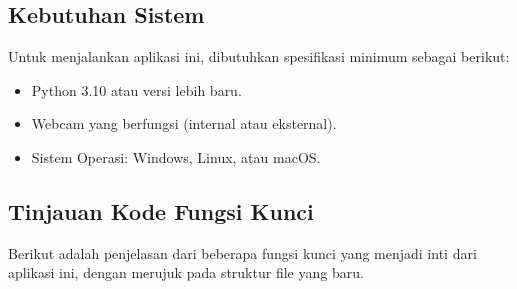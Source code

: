 \documentclass[11pt,a4paper]{article}
\begin{document}
\subsection{Kebutuhan Sistem}
Untuk menjalankan aplikasi ini, dibutuhkan spesifikasi minimum sebagai berikut:
\begin{itemize}
    \item Python 3.10 atau versi lebih baru.
    \item Webcam yang berfungsi (internal atau eksternal).
    \item Sistem Operasi: Windows, Linux, atau macOS.
\end{itemize}

\subsection{Tinjauan Kode Fungsi Kunci}
Berikut adalah penjelasan dari beberapa fungsi kunci yang menjadi inti dari aplikasi ini, dengan merujuk pada struktur file yang baru.
\end{document}
